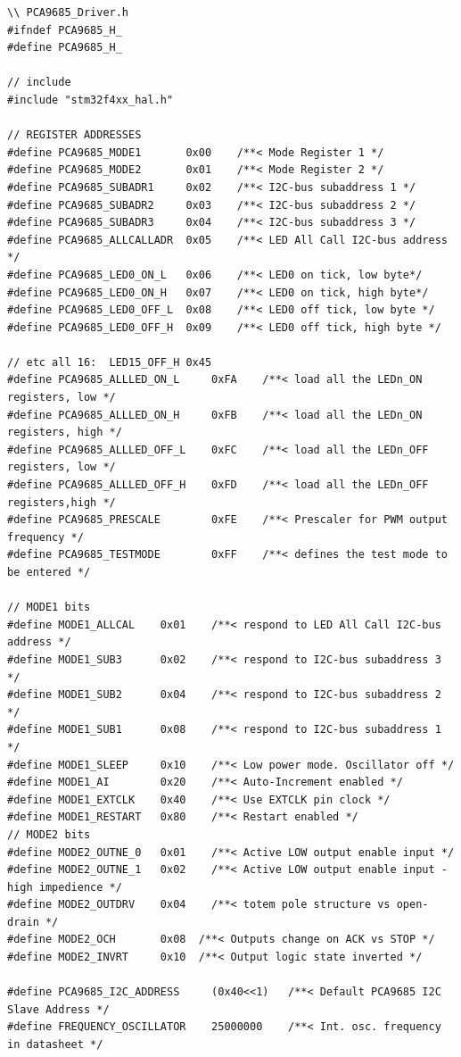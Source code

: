 \begin{lstlisting}
\\ PCA9685_Driver.h
#ifndef PCA9685_H_
#define PCA9685_H_

// include
#include "stm32f4xx_hal.h"

// REGISTER ADDRESSES
#define PCA9685_MODE1       0x00    /**< Mode Register 1 */
#define PCA9685_MODE2       0x01    /**< Mode Register 2 */
#define PCA9685_SUBADR1     0x02    /**< I2C-bus subaddress 1 */
#define PCA9685_SUBADR2     0x03    /**< I2C-bus subaddress 2 */
#define PCA9685_SUBADR3     0x04    /**< I2C-bus subaddress 3 */
#define PCA9685_ALLCALLADR  0x05    /**< LED All Call I2C-bus address */
#define PCA9685_LED0_ON_L   0x06    /**< LED0 on tick, low byte*/
#define PCA9685_LED0_ON_H   0x07    /**< LED0 on tick, high byte*/
#define PCA9685_LED0_OFF_L  0x08    /**< LED0 off tick, low byte */
#define PCA9685_LED0_OFF_H  0x09    /**< LED0 off tick, high byte */

// etc all 16:  LED15_OFF_H 0x45
#define PCA9685_ALLLED_ON_L     0xFA    /**< load all the LEDn_ON registers, low */
#define PCA9685_ALLLED_ON_H     0xFB    /**< load all the LEDn_ON registers, high */
#define PCA9685_ALLLED_OFF_L    0xFC    /**< load all the LEDn_OFF registers, low */
#define PCA9685_ALLLED_OFF_H    0xFD    /**< load all the LEDn_OFF registers,high */
#define PCA9685_PRESCALE        0xFE    /**< Prescaler for PWM output frequency */
#define PCA9685_TESTMODE        0xFF    /**< defines the test mode to be entered */

// MODE1 bits
#define MODE1_ALLCAL    0x01    /**< respond to LED All Call I2C-bus address */
#define MODE1_SUB3      0x02    /**< respond to I2C-bus subaddress 3 */
#define MODE1_SUB2      0x04    /**< respond to I2C-bus subaddress 2 */
#define MODE1_SUB1      0x08    /**< respond to I2C-bus subaddress 1 */
#define MODE1_SLEEP     0x10    /**< Low power mode. Oscillator off */
#define MODE1_AI        0x20    /**< Auto-Increment enabled */
#define MODE1_EXTCLK    0x40    /**< Use EXTCLK pin clock */
#define MODE1_RESTART   0x80    /**< Restart enabled */
// MODE2 bits
#define MODE2_OUTNE_0   0x01    /**< Active LOW output enable input */
#define MODE2_OUTNE_1   0x02    /**< Active LOW output enable input - high impedience */
#define MODE2_OUTDRV    0x04    /**< totem pole structure vs open-drain */
#define MODE2_OCH       0x08  /**< Outputs change on ACK vs STOP */
#define MODE2_INVRT     0x10  /**< Output logic state inverted */

#define PCA9685_I2C_ADDRESS     (0x40<<1)   /**< Default PCA9685 I2C Slave Address */
#define FREQUENCY_OSCILLATOR    25000000    /**< Int. osc. frequency in datasheet */


\end{lstlisting}
